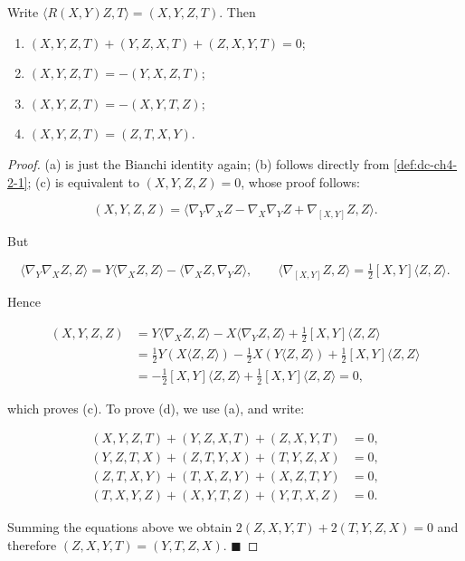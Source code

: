 \begin{proposition}
  \label{prop:dc-ch4-2-5}
  \leanok
  Write $\langle R(X,Y)Z,T\rangle=(X,Y,Z,T)$. Then
  \begin{enumerate}
  \item[(a)] $(X,Y,Z,T)+(Y,Z,X,T)+(Z,X,Y,T)=0$;
  \item[(b)] $(X,Y,Z,T)=-(Y,X,Z,T)$;
  \item[(c)] $(X,Y,Z,T)=-(X,Y,T,Z)$;
  \item[(d)] $(X,Y,Z,T)=(Z,T,X,Y)$.
  \end{enumerate}
\end{proposition}
\begin{proof}
  \leanok
  \sketch
  (a) is just the Bianchi identity again; (b) follows directly from \cref{def:dc-ch4-2-1};
  (c) is equivalent to $(X,Y,Z,Z)=0$, whose proof follows:
  
  $$
  (X,Y,Z,Z)=\langle\nabla_Y\nabla_X Z-\nabla_X\nabla_Y Z+\nabla_{[X,Y]}Z,Z\rangle.
  $$
  
  But
  
  $$
  \langle\nabla_Y\nabla_X Z,Z\rangle=Y\langle\nabla_X Z,Z\rangle-\langle\nabla_X Z,\nabla_Y Z\rangle,\qquad\langle\nabla_{[X,Y]}Z,Z\rangle=\tfrac{1}{2}[X,Y]\langle Z,Z\rangle.
  $$
  
  Hence
  
  $$
  \begin{aligned}(X,Y,Z,Z)&=Y\langle\nabla_X Z,Z\rangle-X\langle\nabla_Y Z,Z\rangle+\tfrac{1}{2}[X,Y]\langle Z,Z\rangle\\&=\tfrac{1}{2}Y(X\langle Z,Z\rangle)-\tfrac{1}{2}X(Y\langle Z,Z\rangle)+\tfrac{1}{2}[X,Y]\langle Z,Z\rangle\\&=-\tfrac{1}{2}[X,Y]\langle Z,Z\rangle+\tfrac{1}{2}[X,Y]\langle Z,Z\rangle=0,\end{aligned}
  $$
  
  which proves (c). To prove (d), we use (a), and write:
  
  $$
  \begin{aligned}(X,Y,Z,T)+(Y,Z,X,T)+(Z,X,Y,T)&=0,\\(Y,Z,T,X)+(Z,T,Y,X)+(T,Y,Z,X)&=0,\\(Z,T,X,Y)+(T,X,Z,Y)+(X,Z,T,Y)&=0,\\(T,X,Y,Z)+(X,Y,T,Z)+(Y,T,X,Z)&=0.\end{aligned}
  $$
  
  Summing the equations above we obtain $2(Z,X,Y,T)+2(T,Y,Z,X)=0$ and therefore
  $(Z,X,Y,T)=(Y,T,Z,X)$. $\blacksquare$
\end{proof}

